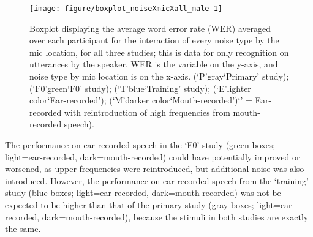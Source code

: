 \begin{figure}[h!]
\DIFaddbeginFL \centering
\DIFaddendFL 

\texttt{[image: figure/boxplot\_noiseXmicXall\_male-1]} 

\caption{Boxplot displaying the average word error rate (WER) averaged over each participant for the interaction of every noise type by the mic location, for all three studies; this is data for only recognition on utterances by the \DIFdelbeginFL {}\DIFdelendFL \DIFaddbeginFL \textbf{} \DIFaddendFL speaker. WER is the variable on the y-axis, and noise type by mic location is on the x-axis. (`P'\DIFdelbeginFL \DIFdelFL{,}\DIFdelendFL \DIFaddbeginFL \DIFaddFL{=}\DIFaddendFL gray\DIFdelbeginFL \DIFdelFL{,}\DIFdelendFL \DIFaddbeginFL \DIFaddFL{=}\DIFaddendFL `Primary' study); (`F0'\DIFdelbeginFL \DIFdelFL{,}\DIFdelendFL \DIFaddbeginFL \DIFaddFL{=}\DIFaddendFL green\DIFdelbeginFL \DIFdelFL{,}\DIFdelendFL \DIFaddbeginFL \DIFaddFL{=}\DIFaddendFL `F0' study); (`T'\DIFdelbeginFL \DIFdelFL{,}\DIFdelendFL \DIFaddbeginFL \DIFaddFL{=}\DIFaddendFL blue\DIFdelbeginFL \DIFdelFL{,}\DIFdelendFL \DIFaddbeginFL \DIFaddFL{=}\DIFaddendFL `Training' study); (`E'\DIFdelbeginFL \DIFdelFL{,}\DIFdelendFL \DIFaddbeginFL \DIFaddFL{=}\DIFaddendFL lighter color\DIFdelbeginFL \DIFdelFL{,}\DIFdelendFL \DIFaddbeginFL \DIFaddFL{=}\DIFaddendFL `Ear-recorded'); (`M'\DIFdelbeginFL \DIFdelFL{,}\DIFdelendFL \DIFaddbeginFL \DIFaddFL{=}\DIFaddendFL darker color\DIFdelbeginFL \DIFdelFL{,}\DIFdelendFL \DIFaddbeginFL \DIFaddFL{=}\DIFaddendFL `Mouth-recorded')\DIFdelbeginFL {}\DIFdelendFL \DIFaddbeginFL \DIFaddFL{; (}\DIFaddendFL `\DIFdelbeginFL {}\DIFdelendFL \DIFaddbeginFL {}\DIFaddendFL ' = Ear-recorded \DIFaddbeginFL {}\DIFaddendFL with reintroduction of high frequencies \DIFdelbeginFL \DIFdelFL{(}\DIFdelendFL from mouth-recorded speech).}
\label{fig:male-all}
\end{figure}


The performance on ear-recorded speech in the `F0' study (green boxes; light=ear-recorded, dark=mouth-recorded) could have potentially improved or worsened, as upper frequencies were reintroduced, but additional noise was also introduced.  However, the performance on ear-recorded speech from the `training' study (blue boxes; light=ear-recorded, dark=mouth-recorded) was not be expected to be higher than that of the primary study (gray boxes; light=ear-recorded, dark=mouth-recorded), because the stimuli in both studies are exactly the same.  

